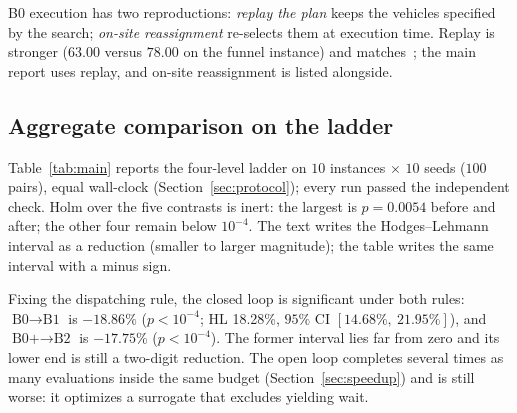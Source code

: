 \documentclass[manuscript,screen,review]{acmart}
\newcommand{\NCases}{10}
\newcommand{\NSeeds}{10}
\newcommand{\NPairs}{100}
\newcommand{\GainLoopRule}{18.86\%}      %
\newcommand{\PLoopRule}{<10^{-4}}
\newcommand{\GainLoopProbe}{17.75\%}     %
\newcommand{\PLoopProbe}{<10^{-4}}
\newcommand{\PProbeLoop}{=0.0054}
\newcommand{\HLLoopRule}{18.28\%}
\newcommand{\CILoopRule}{$[14.68\%,\ 21.95\%]$}
\begin{document}
B0 execution has two reproductions: \emph{replay the plan} keeps the vehicles specified by the search; \emph{on-site reassignment} re-selects them at execution time.
Replay is stronger ($63.00$ versus $78.00$ on the funnel instance) and matches~\cite{li2026framework}; the main report uses replay, and on-site reassignment is listed alongside.

\subsection{Aggregate comparison on the ladder}
\label{sec:main}

Table~\ref{tab:main} reports the four-level ladder on $\NCases$ instances $\times$ $\NSeeds$ seeds ($\NPairs$ pairs), equal wall-clock (Section~\ref{sec:protocol}); every run passed the independent check.
Holm over the five contrasts is inert: the largest is $p\PProbeLoop$ before and after; the other four remain below $10^{-4}$.
The text writes the Hodges--Lehmann interval as a reduction (smaller to larger magnitude); the table writes the same interval with a minus sign.

\begin{table}[t]
\caption{Four-level ladder under an equal wall-clock budget, and the four one-factor pairs.
Negative is better.
$n=\NPairs$ pairs on $(\text{instance},\text{seed})$; two-sided Wilcoxon signed-rank; Holm over the five contrasts
($^{*}p<0.05$, $^{**}p<0.01$, $^{***}p<0.001$).
HL is the Hodges--Lehmann pseudomedian and its $95\%$ interval (same source as the test; the mean is for adding across tables, Section~\ref{sec:protocol}).
A bold header marks this paper's configuration, not a per-instance winner (Table~\ref{tab:bytag}).}
\label{tab:main}
\small

\end{table}

Fixing the dispatching rule, the closed loop is significant under both rules:
$\text{B0}\to\text{B1}$ is $-\GainLoopRule$ ($p\PLoopRule$; HL \HLLoopRule{}, $95\%$ CI \CILoopRule{}),
and $\text{B0+}\to\text{B2}$ is $-\GainLoopProbe$ ($p\PLoopProbe$).
The former interval lies far from zero and its lower end is still a two-digit reduction.
The open loop completes several times as many evaluations inside the same budget (Section~\ref{sec:speedup}) and is still worse: it optimizes a surrogate that excludes yielding wait.
\end{document}
